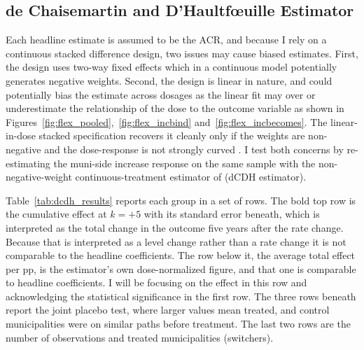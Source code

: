 \documentclass[12pt]{article}
\begin{document}
\subsection{de Chaisemartin and D'Haultfœuille Estimator}
\label{subsec:rob-acr}

Each headline estimate is assumed to be the ACR, and because I rely on a continuous stacked difference design, two issues may cause biased estimates. First, the design uses two-way fixed effects which in a continuous model potentially generates negative weights. Second, the design is linear in nature, and could potentially bias the estimate across dosages as the linear fit may over or underestimate the relationship of the dose to the outcome variable as shown in Figures~\ref{fig:flex_pooled},~\ref{fig:flex_incbind} and~\ref{fig:flex_incbecomes}. 
The linear-in-dose stacked
specification recovers it cleanly only if the weights are
non-negative and the dose-response is not strongly curved
\citep{dechaisemartin2024}. I test both concerns by re-estimating the
muni-side increase response on the same sample with the non-negative-weight
continuous-treatment estimator of
\citet{chaisemartinUsingDid_multiplegt_dynEstimate2025} (dCDH estimator).




Table~\ref{tab:dcdh_results} reports each group in a set of rows. The
bold top row is the cumulative effect at $k=+5$ with its standard error
beneath, which is interpreted as the total change in the outcome five years after the
rate change. Because that is interpreted as a
level change rather than a rate change it is not comparable to the headline
coefficients. The row below it, the
average total effect per pp, is the estimator's own dose-normalized
figure, and that one is comparable to headline coefficients. I will be focusing on the effect in this row and acknowledging the statistical significance in the first row. The three rows beneath report the joint placebo test, where
larger values mean treated, and control municipalities were on similar
paths before treatment. The last two rows are the number of observations and treated municipalities (switchers).
\end{document}
